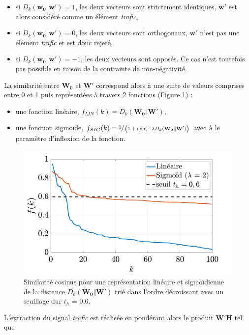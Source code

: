 \begin{itemize}
\item si $D_{k}(\mathbf{w_0}\Vert\mathbf{w'}) = 1$, les deux vecteurs sont strictement identiques, $\mathbf{w'}$ est alors considéré comme un élément \textit{trafic},
\item si $D_{k}(\mathbf{w_0}\Vert\mathbf{w'}) = 0$, les deux vecteurs sont orthogonaux, $\mathbf{w'}$ n'est pas une élément \textit{trafic} et est donc rejeté,
\item si $D_{k}(\mathbf{w_0}\Vert\mathbf{w'}) = -1$, les deux vecteurs sont opposés. Ce cas n'est toutefois pas possible en raison de la contrainte de non-négativité.\\
\end{itemize}

La similarité entre $\mathbf{W_0}$ et $\mathbf{W'}$ correspond alors à une suite de valeurs comprises entre 0 et 1 puis représentées à travers 2 fonctions (Figure \ref{fig:resume_simil}) :

\begin{itemize}
\item une fonction linéaire, $f_{LIN}(k) = D_{k}(\mathbf{W_0} \Vert \mathbf{W'})$,
\item une fonction sigmoïde, $f_{SIG}(k) = \sfrac{1}{\left(1+\exp({-\lambda D_{k}(\mathbf{W_0} \Vert \mathbf{W'})}\right)}$ avec $\lambda$ le paramètre d'inflexion de la fonction.\\
\end{itemize}

\begin{figure}
    \centering
    \includegraphics[width=0.7\linewidth]{./figures/NMF/lin_sig.pdf}
    \caption{Similarité cosinus pour une représentation linéaire et sigmoïdienne de la distance $D_{k}(\mathbf{W_0} \Vert \mathbf{W'})$ trié dans l'ordre décroissant avec un seuillage dur $t_h$ = 0,6. }
    \label{fig:resume_simil}
\end{figure}

L'extraction du signal \textit{trafic} est réalisée en pondérant alors le produit $\mathbf{W'H}$ tel que

